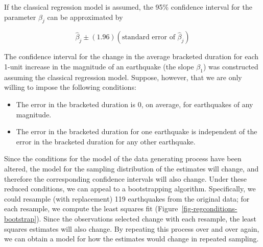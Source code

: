 \documentclass[
  letterpaper,
  DIV=11,
  numbers=noendperiod]{scrreprt}
\providecommand{\tightlist}{%
  \setlength{\itemsep}{0pt}\setlength{\parskip}{0pt}}\usepackage{longtable,booktabs,array}
\theoremstyle{plain}
\theoremstyle{definition}
\theoremstyle{definition}
\theoremstyle{remark}
\begin{document}
\begin{tcolorbox}[enhanced jigsaw, breakable, titlerule=0mm, colframe=quarto-callout-note-color-frame, bottomtitle=1mm, opacityback=0, rightrule=.15mm, toptitle=1mm, arc=.35mm, bottomrule=.15mm, left=2mm, title=\textcolor{quarto-callout-note-color}{\faInfo}\hspace{0.5em}{Formula for Confidence Interval Under Classical Regression Model}, leftrule=.75mm, coltitle=black, toprule=.15mm, colbacktitle=quarto-callout-note-color!10!white, colback=white, opacitybacktitle=0.6]

If the classical regression model is assumed, the 95\% confidence
interval for the parameter \(\beta_j\) can be approximated by

\[\widehat{\beta}_j \pm (1.96)\left(\text{standard error of } \widehat{\beta}_j\right)\]

\end{tcolorbox}

The confidence interval for the change in the average bracketed duration
for each 1-unit increase in the magnitude of an earthquake (the slope
\(\beta_1\)) was constructed assuming the classical regression model.
Suppose, however, that we are only willing to impose the following
conditions:

\begin{itemize}
\tightlist
\item
  The error in the bracketed duration is 0, on average, for earthquakes
  of any magnitude.
\item
  The error in the bracketed duration for one earthquake is independent
  of the error in the bracketed duration for any other earthquake.
\end{itemize}

Since the conditions for the model of the data generating process have
been altered, the model for the sampling distribution of the estimates
will change, and therefore the corresponding confidence intervals will
also change. Under these reduced conditions, we can appeal to a
bootstrapping algorithm. Specifically, we could resample (with
replacement) 119 earthquakes from the original data; for each resample,
we compute the least squares fit
(Figure~\ref{fig-regconditions-bootstrap}). Since the observations
selected change with each resample, the least squares estimates will
also change. By repeating this process over and over again, we can
obtain a model for how the estimates would change in repeated sampling.
\end{document}
